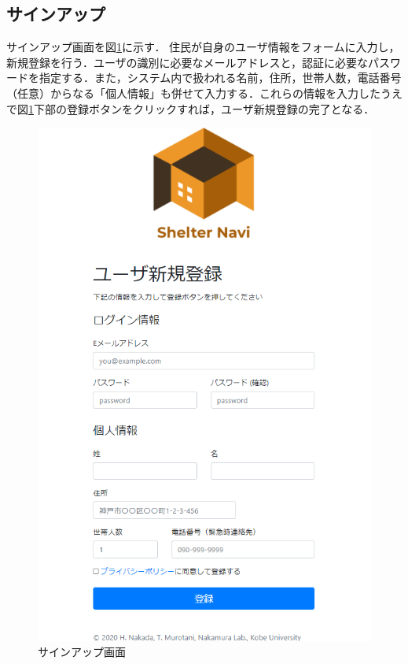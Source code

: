 \documentclass[technicalreport,dvipdfmx]{ieicej}
\begin{document}
\subsection{サインアップ}
\label{sec:signup}
サインアップ画面を図\ref{fig:signup}に示す．
住民が自身のユーザ情報をフォームに入力し，新規登録を行う．ユーザの識別に必要なメールアドレスと，認証に必要なパスワードを指定する．また，システム内で扱われる名前，住所，世帯人数，電話番号（任意）からなる「個人情報」も併せて入力する．これらの情報を入力したうえで図\ref{fig:signup}下部の登録ボタンをクリックすれば，ユーザ新規登録の完了となる．

\begin{figure}[t]
     \begin{center}
          \includegraphics[scale=0.6,pagebox=cropbox,clip]{img/signup.png}
          \caption{サインアップ画面}
          \label{fig:signup}
     \end{center}
\end{figure}
\end{document}
